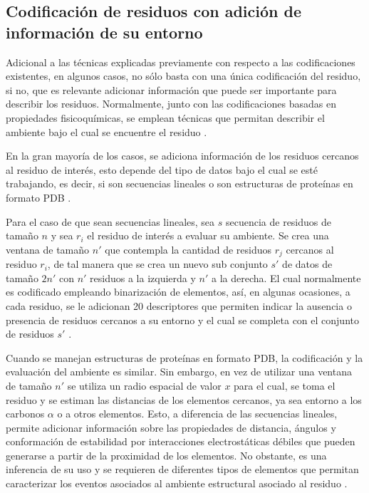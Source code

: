 \subsection{Codificación de residuos con adición de información de su entorno}

Adicional a las técnicas explicadas previamente con respecto a las codificaciones existentes, en algunos casos, no sólo basta con una única codificación del residuo, si no, que es relevante adicionar información que puede ser importante para describir los residuos. Normalmente, junto con las codificaciones basadas en propiedades fisicoquímicas, se emplean técnicas que permitan describir el ambiente bajo el cual se encuentre el residuo \cite{masso2008accurate}.

En la gran mayoría de los casos, se adiciona información de los residuos cercanos al residuo de interés, esto depende del tipo de datos bajo el cual se esté trabajando, es decir, si son secuencias lineales o son estructuras de proteínas en formato PDB \cite{capriotti2008three, capriotti2005mutant2}. 

Para el caso de que sean secuencias lineales, sea $s$ secuencia de residuos de tamaño $n$ y sea $r_{i}$ el residuo de interés a evaluar su ambiente. Se crea una ventana de tamaño $n'$ que contempla la cantidad de residuos $r_j$ cercanos al residuo $r_{i}$, de tal manera que se crea un nuevo sub conjunto $s'$ de datos de tamaño $2n'$ con $n'$ residuos a la izquierda y $n'$ a la derecha. El cual normalmente es codificado empleando binarización de elementos, así, en algunas ocasiones, a cada residuo, se le adicionan 20 descriptores que permiten indicar la ausencia o presencia de residuos cercanos a su entorno y el cual se completa con el conjunto de residuos $s'$ \cite{capriotti2008three}.

Cuando se manejan estructuras de proteínas en formato PDB, la codificación y la evaluación del ambiente es similar. Sin embargo, en vez de utilizar una ventana de tamaño $n'$ se utiliza un radio espacial de valor $x$ para el cual, se toma el residuo y se estiman las distancias de los elementos cercanos, ya sea entorno a los carbonos $\alpha$ o a otros elementos. Esto, a diferencia de las secuencias lineales, permite adicionar información sobre las propiedades de distancia, ángulos y conformación de estabilidad por interacciones electrostáticas débiles que pueden generarse a partir de la proximidad de los elementos. No obstante, es una inferencia de su uso y se requieren de diferentes tipos de elementos que permitan caracterizar los eventos asociados al ambiente estructural asociado al residuo \cite{capriotti2008three}.

